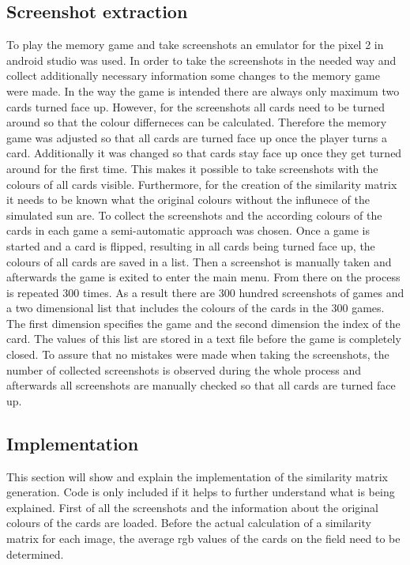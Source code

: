 \subsection{Screenshot extraction}
\label{screenshot_extraction}
To play the memory game and take screenshots an emulator for the pixel 2 in android studio was used. In order to take the screenshots in the needed way and collect additionally necessary information some changes to the memory game were made. In the way the game is intended there are always only maximum two cards turned face up. However, for the screenshots all cards need to be turned around so that the colour differneces can be calculated. Therefore the memory game was adjusted so that all cards are turned face up once the player turns a card. Additionally it was changed so that cards stay face up once they get turned around for the first time. This makes it possible to take screenshots with the colours of all cards visible. Furthermore, for the creation of the similarity matrix it needs to be known what the original colours without the influnece of the simulated sun are. To collect the screenshots and the according colours of the cards in each game a semi-automatic approach was chosen. Once a game is started and a card is flipped, resulting in all cards being turned face up, the colours of all cards are saved in a list. Then a screenshot is manually taken and afterwards the game is exited to enter the main menu. From there on the process is repeated 300 times. As a result there are 300 hundred screenshots of games and a two dimensional list that includes the colours of the cards in the 300 games. The first dimension specifies the game and the second dimension the index of the card. The values of this list are stored in a text file before the game is completely closed. To assure that no mistakes were made when taking the screenshots, the number of collected screenshots is observed during the whole process and afterwards all screenshots are manually checked so that all cards are turned face up.

\subsection{Implementation}
\label{implementation}
This section will show and explain the implementation of the similarity matrix generation. Code is only included if it helps to further understand what is being explained. First of all the screenshots and the information about the original colours of the cards are loaded. Before the actual calculation of a similarity matrix for each image, the average rgb values of the cards on the field need to be determined. 

